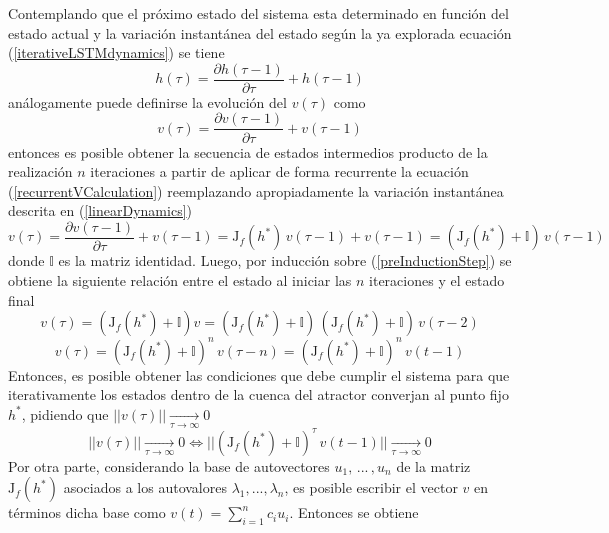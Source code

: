 \documentclass{article}
\begin{document}
	Contemplando que el próximo estado del sistema esta determinado en función del estado actual y la variación instantánea del estado según la ya explorada ecuación (\ref{iterativeLSTMdynamics}) se tiene
	\begin{equation}\label{recurrentStateCalculation}
	h(\tau) = \dfrac{\partial h(\tau -1)}{\partial \tau} + h(\tau -1)
	\end{equation}
	análogamente puede definirse la evolución del $v(\tau)$ como 
	\begin{equation}\label{recurrentVCalculation}
	v(\tau) = \dfrac{\partial v(\tau -1)}{\partial \tau} + v(\tau -1)
	\end{equation}
	entonces es posible obtener la secuencia de estados intermedios producto de la realización $n$ iteraciones a partir de aplicar de forma recurrente la ecuación (\ref{recurrentVCalculation}) reemplazando apropiadamente la variación instantánea descrita en (\ref{linearDynamics})
	\begin{equation}\label{preInductionStep}
	v(\tau) = \dfrac{\partial v(\tau -1)}{\partial \tau} + v(\tau -1) = \mathrm{J}_f(h^*) \, v(\tau -1) + v(\tau -1) = (\mathrm{J}_f(h^*) + \mathbb{I}) \, v(\tau -1)
	\end{equation}
	donde $\mathbb{I}$ es la matriz identidad. Luego, por inducción sobre (\ref{preInductionStep}) se obtiene la siguiente relación entre el estado al iniciar las $n$ iteraciones y el estado final
	\begin{equation*}
	v(\tau) = (\mathrm{J}_f(h^*) + \mathbb{I}) v = (\mathrm{J}_f(h^*) + \mathbb{I}) \, (\mathrm{J}_f(h^*) + \mathbb{I})  \, v(\tau-2)
	\end{equation*}
	\begin{equation*}
	v(\tau) = (\mathrm{J}_f(h^*) + \mathbb{I})^n \, v(\tau-n) = (\mathrm{J}_f(h^*) + \mathbb{I})^n \, v(t-1)
	\end{equation*}
	Entonces, es posible obtener las condiciones que debe cumplir el sistema para que iterativamente los estados dentro de la cuenca del atractor converjan al punto fijo $h^*$, pidiendo que $||v(\tau)||\xrightarrow[\tau \to \infty]{} 0$
	\begin{equation*}
	||v(\tau)|| \xrightarrow[\tau \to \infty]{} 0 \iff ||(\mathrm{J}_f(h^*) + \mathbb{I})^\tau \, v(t-1)|| \xrightarrow[\tau \to \infty]{} 0
	\end{equation*}
	Por otra parte, considerando la base de autovectores ${ u_1, \,... \,, u_n }$ de la matriz $\mathrm{J}_f(h^*)$ asociados a los autovalores $\lambda_1, ... , \lambda_n$, es posible escribir el vector $v$ en términos dicha base como $v(t) = \sum_{i=1}^{n} c_i u_i$. Entonces se obtiene
\end{document}

